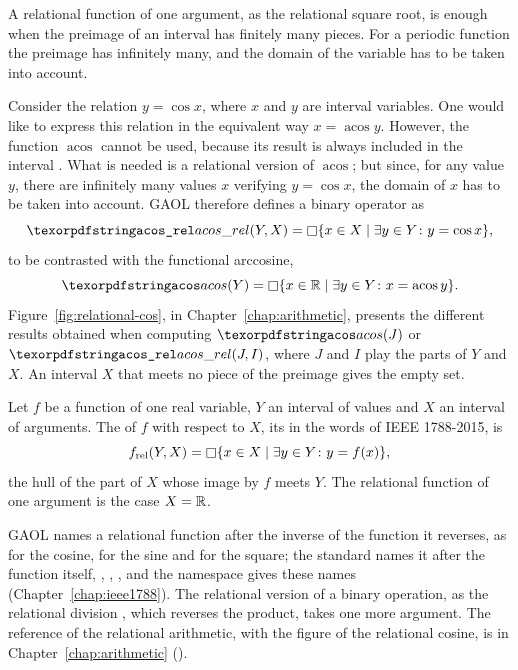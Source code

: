 \medskip
A relational function of one argument, as the relational square root, is
enough when the preimage of an interval has finitely many pieces. For a
periodic function the preimage has infinitely many, and the domain of the
variable has to be taken into account.

\begin{Ex}\label{ex:acos-relational}
Consider the relation $y=\cos x$, where $x$ and $y$ are interval variables.
One would like to express this relation in the equivalent way
$x=\operatorname{acos} y$. However, the function $\operatorname{acos}$
cannot be used, because its result is always included in the interval
. What is needed is a relational version of
$\operatorname{acos}$; but since, for any value $y$, there are infinitely
many values $x$ verifying $y=\cos x$, the domain of $x$ has to be taken
into account. GAOL therefore defines a binary operator  as
\begin{equation*}
  \code{acos\_rel}(Y, X)=\hull{\{x\in X\mid\exists y\in Y\colon y=\cos x\}},
\end{equation*}
to be contrasted with the functional arccosine,
\begin{equation*}
  \code{acos}(Y)=\hull{\{x\in\RSet\mid\exists y\in Y\colon
    x=\operatorname{acos} y\}}.
\end{equation*}
Figure~\ref{fig:relational-cos}, in Chapter~\ref{chap:arithmetic}, presents
the different results obtained when computing $\code{acos}(J)$ or
$\code{acos\_rel}(J, I)$, where $J$ and $I$ play the parts of $Y$ and $X$.
An interval $X$ that meets no piece of the
preimage gives the empty set.\newinvfive
\end{Ex}

\begin{Def}\label{def:relational}
Let $f$ be a function of one real variable, $Y$ an interval of values and
$X$ an interval of arguments. The  of $f$ with
respect to $X$, its  in the words of IEEE 1788-2015,
is
\begin{equation*}
  f_{\mathrm{rel}}(Y, X)=\mathop{\Box} \{x\in X\mid\exists y\in Y\colon y=f(x)\},
\end{equation*}
the hull of the part of $X$ whose image by $f$ meets $Y$. The relational
function of one argument is the case $X=\mathbb{R}$.
\end{Def}

GAOL names a relational function after the inverse of the function it
reverses, as  for the cosine,  for the sine
and  for the square; the standard names it after the
function itself, , , , and the
namespace  gives these names
(Chapter~\ref{chap:ieee1788}). The relational version of a binary
operation, as the relational division , which reverses the
product, takes one more argument. The reference of the relational
arithmetic, with the figure of the relational cosine, is in
Chapter~\ref{chap:arithmetic} ().

